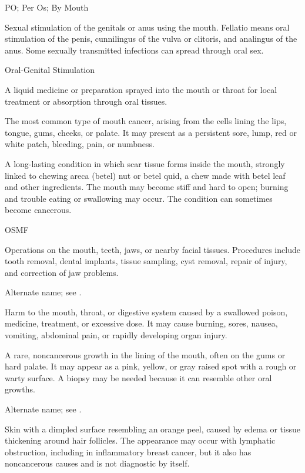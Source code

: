 \synonyms
PO; Per Os; By Mouth

 Sexual stimulation of the genitals or anus using the mouth. Fellatio means oral stimulation of the penis, cunnilingus of the vulva or clitoris, and analingus of the anus. Some sexually transmitted infections can spread through oral sex.

\synonyms
Oral-Genital Stimulation

 A liquid medicine or preparation sprayed into the mouth or throat for local treatment or absorption through oral tissues.

 The most common type of mouth cancer, arising from the cells lining the lips, tongue, gums, cheeks, or palate. It may present as a persistent sore, lump, red or white patch, bleeding, pain, or numbness.

 A long-lasting condition in which scar tissue forms inside the mouth, strongly linked to chewing areca (betel) nut or betel quid, a chew made with betel leaf and other ingredients. The mouth may become stiff and hard to open; burning and trouble eating or swallowing may occur. The condition can sometimes become cancerous.

\synonyms
OSMF

 Operations on the mouth, teeth, jaws, or nearby facial tissues. Procedures include tooth removal, dental implants, tissue sampling, cyst removal, repair of injury, and correction of jaw problems.

 Alternate name; see .

 Harm to the mouth, throat, or digestive system caused by a swallowed poison, medicine, treatment, or excessive dose. It may cause burning, sores, nausea, vomiting, abdominal pain, or rapidly developing organ injury.

 A rare, noncancerous growth in the lining of the mouth, often on the gums or hard palate. It may appear as a pink, yellow, or gray raised spot with a rough or warty surface. A biopsy may be needed because it can resemble other oral growths.

 Alternate name; see .

 Skin with a dimpled surface resembling an orange peel,
caused by edema or tissue thickening around hair follicles. The appearance may occur
with lymphatic obstruction, including in inflammatory breast cancer, but it also has
noncancerous causes and is not diagnostic by itself.

